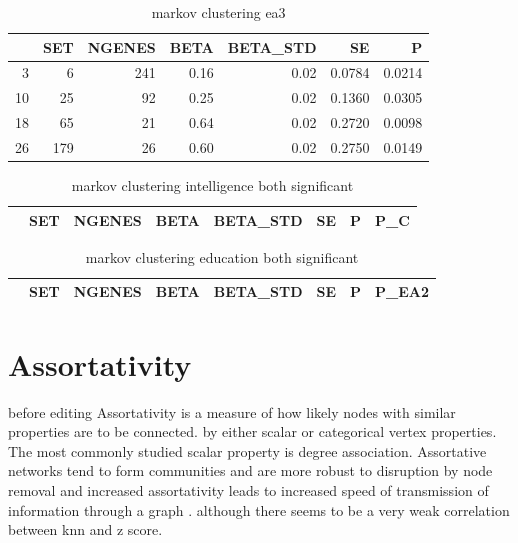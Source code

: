 \begin{table}[ht]
\centering
\begin{tabular}{rrrrrrr}
  \hline
 & SET & NGENES & BETA & BETA\_STD & SE & P \\ 
  \hline
3 &  6 & 241 & 0.16 & 0.02 & 0.0784 & 0.0214 \\ 
  10 & 25 & 92 & 0.25 & 0.02 & 0.1360 & 0.0305 \\ 
  18 & 65 & 21 & 0.64 & 0.02 & 0.2720 & 0.0098 \\ 
  26 & 179 & 26 & 0.60 & 0.02 & 0.2750 & 0.0149 \\ 
   \hline
\end{tabular}
\caption{markov clustering ea3} 
\label{lab:markov clustering ea3}
\end{table}
\begin{table}[ht]
\centering
\begin{tabular}{rrrrrrrr}
  \hline
 & SET & NGENES & BETA & BETA\_STD & SE & P & P\_C \\ 
  \hline
\hline
\end{tabular}
\caption{markov clustering intelligence both significant} 
\label{lab:markov clustering intelligence both significant}
\end{table}
\begin{table}[ht]
\centering
\begin{tabular}{rrrrrrrr}
  \hline
 & SET & NGENES & BETA & BETA\_STD & SE & P & P\_EA2 \\ 
  \hline
\hline
\end{tabular}
\caption{markov clustering education both significant} 
\label{lab:markov clustering education both significant}
\end{table}

\section{Assortativity}
before editing
Assortativity is a measure of how likely nodes with similar properties are to be connected. \cite{newman2002assortative} by either scalar or categorical vertex properties. The most commonly studied scalar property is degree association. Assortative networks tend to form communities and are more robust to disruption by node removal  \cite{newman2002assortative} and increased assortativity leads to increased speed of transmission of information through a graph \cite{noldus2015assortativity}.  although there seems to be a very weak correlation between knn and z score. 
